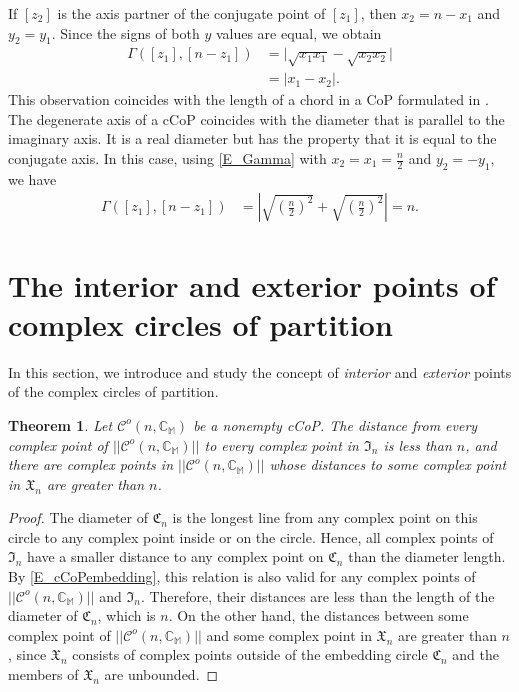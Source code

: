 \documentclass[12pt]{amsart}
\newtheorem{theorem}{Theorem}[section]
\theoremstyle{definition}
\theoremstyle{remark}
\numberwithin{equation}{section}
\newcommand{\abs}[1]{\lvert#1\rvert}
\newcommand{\C}{\mathcal{C}}
\newcommand{\CC}{\mathbb{C}}
\newcommand{\CV}{\mathfrak{C}}
\newcommand{\M}{\mathbb{M}}
\newcommand{\I}{\mathfrak{I}}
\newcommand{\E}{\mathfrak{X}}
\begin{document}
If $[z_2]$ is the axis partner of the conjugate point of $[z_1]$, then $x_2=n-x_1$ and $y_2=y_1$. Since the signs of both $y$ values are equal, we obtain
\begin{align*}
\Gamma([z_1],[n-z_1])
&=\abs{\sqrt{x_1 x_1}-\sqrt{x_2 x_2}}\\
&=\abs{x_1 - x_2}.
\end{align*}
This observation coincides with the length of a chord in a CoP formulated in \cite{CoP}.\\

The degenerate axis of a cCoP coincides with the diameter that is parallel to the imaginary axis. It is a real diameter but has the property that it is equal to the conjugate axis. In this case, using \eqref{E_Gamma} with $x_2=x_1=\frac{n}{2}$ and $y_2=-y_1$, we have
\begin{align*}
\Gamma([z_1],[n-z_1])
&=\left|\sqrt{\left(\frac{n}{2}\right)^2}+\sqrt{\left(\frac{n}{2}\right)^2}\right|=n.
\end{align*}
\bigskip

\section{The interior and exterior points of complex circles of partition}

In this section, we introduce and study the concept of \emph{interior} and \emph{exterior} points of the complex circles of partition.

\begin{theorem}\label{T_interior}
Let $\C^o(n,\CC_{\M})$ be a nonempty cCoP. The distance from every complex point of $||\C^o(n,\CC_{\M})||$ to every complex point in $\I_n$ is less than $n$, and there are complex points in $||\C^o(n,\CC_{\M})||$ whose distances to some complex point in $\E_n$ are greater than $n$.
\end{theorem}

\begin{proof}
The diameter of $\CV_n$ is the longest line from any complex point on this circle to any complex point inside or on the circle. Hence, all complex points of $\I_n$ have a smaller distance to any complex point on $\CV_n$ than the diameter length. By \eqref{E_cCoPembedding}, this relation is also valid for any complex points of $||\C^o(n,\CC_{\M})||$ and $\I_n$. Therefore, their distances are less than the length of the diameter of $\CV_n$, which is $n$. On the other hand, the distances between some complex point of $||\C^o(n,\CC_{\M})||$ and some complex point in $\E_n$ are greater than $n$, since $\E_n$ consists of complex points outside of the embedding circle $\CV_n$ and the members of $\E_n$ are unbounded. 
\end{proof}
\bigskip
\end{document}
